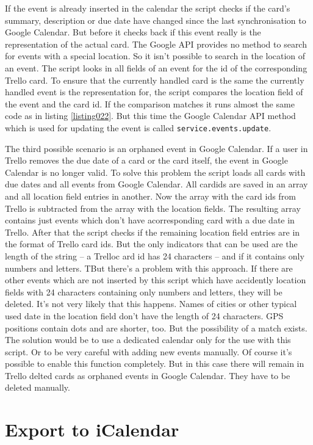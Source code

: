 If the event is already inserted in the calendar the script checks if the card's summary, description or due date have changed since the last synchronisation to Google Calendar. But before it checks back if this event really is the representation of the actual card. The Google API provides no method to search for events with a special location. So it isn't possible to search in the location of an event. The script looks in all fields of an event for the id of the corresponding Trello card. To ensure that the currently handled card is the same the currently handled event is the representation for, the script compares the location field of the event and the card id. If the comparison matches it runs almost the same code as in listing \ref{listing022}. But this time the Google Calendar API method which is used for updating the event is called \lstinline{service.events.update}. 

The third possible scenario is an orphaned event in Google Calendar. If a user in Trello removes the due date of a card or the card itself, the event in Google Calendar is no longer valid. To solve this problem the script loads all cards with due dates and all events from Google Calendar. All cardids are saved in an array and all location field entries in another. Now the array with the card ids from Trello is subtracted from the array with the location fields. The resulting array contains just events which don't have acorresponding card with a due date in Trello. After that the script checks if the remaining location field entries are in the format of Trello card ids. But the only indicators that can be used are the length of the string – a Trelloc ard id has 24 characters – and if it contains only numbers and letters. TBut there's a problem with this approach. If there are other events which are not inserted by this script which have accidently location fields with 24 characters containing only numbers and letters, they will be deleted. It's not very likely that this happens. Names of cities or other typical used date in the location field don't have the length of 24 characters. GPS positions contain dots and are shorter, too. But the possibility of a match exists. The solution would be to use a dedicated calendar only for the use with this script. Or to be very careful with adding new events manually. Of course it's possible to enable this function completely. But in this case there will remain in Trello delted cards as orphaned events in Google Calendar. They have to be deleted manually.

\section{Export to iCalendar}

